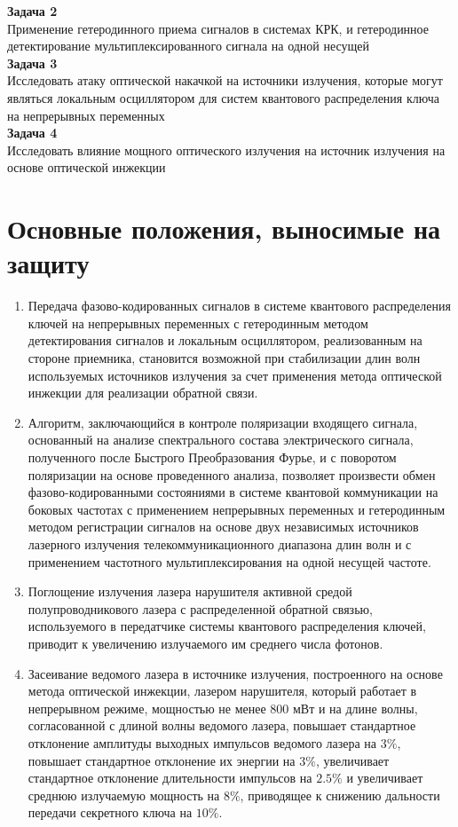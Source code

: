 \textbf{Задача 2}\\
Применение гетеродинного приема сигналов в системах КРК, и гетеродинное детектирование мультиплексированного сигнала на одной несущей\\

\textbf{Задача 3}\\
Исследовать атаку оптической накачкой на источники излучения, которые могут являться локальным осциллятором для систем квантового распределения ключа на непрерывных переменных\\

\textbf{Задача 4}\\
Исследовать влияние мощного оптического излучения на источник излучения на основе оптической инжекции\\

\section*{Основные положения, выносимые на защиту}
\begin{enumerate}
    \item Передача фазово-кодированных сигналов в системе квантового распределения ключей на непрерывных переменных с гетеродинным методом детектирования сигналов и локальным осциллятором, реализованным на стороне приемника, становится возможной при стабилизации длин волн используемых источников излучения за счет применения метода оптической инжекции для реализации обратной связи.
    \item Алгоритм, заключающийся в контроле поляризации входящего сигнала,  основанный на анализе спектрального состава электрического сигнала, полученного после Быстрого Преобразования Фурье, и с поворотом поляризации на основе проведенного анализа, позволяет произвести обмен фазово-кодированными состояниями в системе квантовой коммуникации на боковых частотах с применением непрерывных переменных и гетеродинным методом регистрации сигналов на основе двух независимых источников лазерного  излучения телекоммуникационного диапазона длин волн  и с применением частотного мультиплексирования на одной несущей частоте. 
    \item Поглощение излучения лазера нарушителя  активной средой полупроводникового лазера с распределенной обратной связью, используемого в передатчике системы квантового распределения ключей, приводит к увеличению излучаемого им среднего числа фотонов.
    \item Засеивание ведомого лазера в источнике излучения, построенного  на основе метода оптической инжекции, лазером нарушителя, который работает в непрерывном режиме, мощностью не менее 800 мВт и на длине волны, согласованной с длиной волны ведомого лазера,  повышает стандартное отклонение амплитуды выходных импульсов ведомого лазера на $3\%$, повышает стандартное отклонение их энергии на $3\%$, увеличивает стандартное отклонение длительности импульсов на $2.5\%$ и увеличивает среднюю излучаемую мощность на $8\%$, приводящее к снижению дальности передачи секретного ключа на $10\%$.
\end{enumerate}
